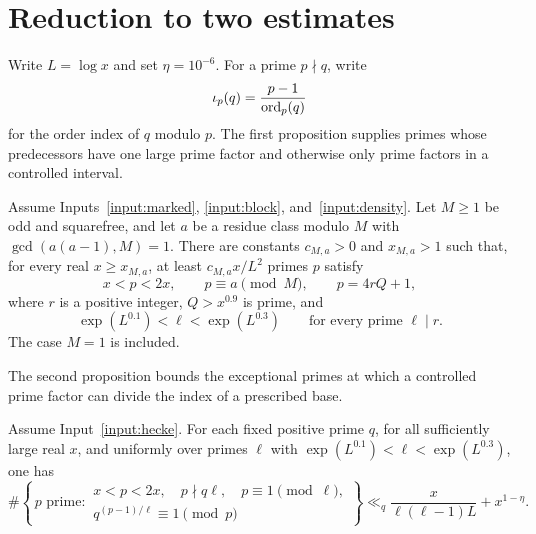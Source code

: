 \section{Reduction to two estimates}

Write \(L=\log x\) and set \(\eta=10^{-6}\).  For a prime \(p\nmid q\), write
\[
        \iota_p(q)=\frac{p-1}{\operatorname{ord}_p(q)}
\]
for the order index of \(q\) modulo \(p\).  The first proposition supplies
primes whose predecessors have one large prime factor and otherwise only
prime factors in a controlled interval.

\begin{proposition}
\label{prop:reservoir}
Assume Inputs~\ref{input:marked}, \ref{input:block},
and~\ref{input:density}.  Let \(M\ge1\) be odd and squarefree, and let
\(a\) be a residue class modulo \(M\) with
\(\gcd(a(a-1),M)=1\).  There are constants \(c_{M,a}>0\) and \(x_{M,a}>1\)
such that, for every real \(x\ge x_{M,a}\), at least
\(c_{M,a}x/L^2\) primes \(p\) satisfy
\[
 x<p<2x,\qquad p\equiv a\pmod M,\qquad p=4rQ+1,
\]
where \(r\) is a positive integer, \(Q>x^{0.9}\) is prime, and
\[
 \exp(L^{0.1})<\ell<\exp(L^{0.3})
 \qquad\text{for every prime }\ell\mid r.
\]
The case \(M=1\) is included.
\end{proposition}

The second proposition bounds the exceptional primes at which a controlled
prime factor can divide the index of a prescribed base.

\begin{proposition}
\label{prop:splitting}
Assume Input~\ref{input:hecke}.  For each fixed positive prime \(q\), for all
sufficiently large real \(x\), and uniformly over primes \(\ell\) with
\(\exp(L^{0.1})<\ell<\exp(L^{0.3})\), one has
\[
 \#\left\{\,p\text{ prime}:
 \begin{array}{l}
 x<p<2x,\quad p\nmid q\ell,\quad p\equiv1\pmod\ell,\\
 q^{(p-1)/\ell}\equiv1\pmod p
 \end{array}\right\}
 \ll_q \frac{x}{\ell(\ell-1)L}+x^{1-\eta}.
\]
\end{proposition}

